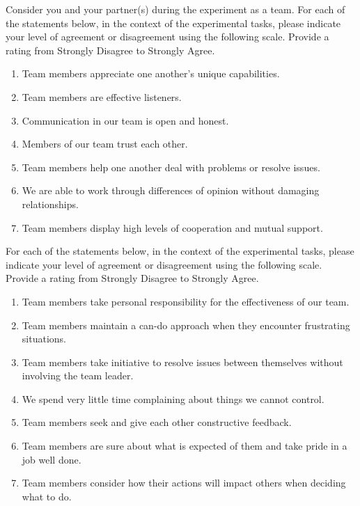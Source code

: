 \documentclass[msom,nonblindrev]{01 latex/class/informs3}
\begin{document}
\begin{APPENDICES}
Consider you and your partner(s) during the experiment as a team.
For each of the statements below, in the context of the experimental tasks, please indicate your level of agreement or disagreement using the following scale. Provide a rating from Strongly Disagree to Strongly Agree.

\begin{enumerate}
    \item Team members appreciate one another's unique capabilities.
    \item Team members are effective listeners.
    \item Communication in our team is open and honest.
    \item Members of our team trust each other.
    \item Team members help one another deal with problems or resolve issues.
    \item We are able to work through differences of opinion without damaging relationships.
    \item Team members display high levels of cooperation and mutual support.
\end{enumerate}

\vspace{5mm}
For each of the statements below, in the context of the experimental tasks, please indicate your level of agreement or disagreement using the following scale. Provide a rating from Strongly Disagree to Strongly Agree.

\begin{enumerate}
    \item Team members take personal responsibility for the effectiveness of our team.
    \item Team members maintain a can-do approach when they encounter frustrating situations.
    \item Team members take initiative to resolve issues between themselves without involving the team leader.
    \item We spend very little time complaining about things we cannot control.
    \item Team members seek and give each other constructive feedback.
    \item Team members are sure about what is expected of them and take pride in a job well done.
    \item Team members consider how their actions will impact others when deciding what to do.
\end{enumerate}


\end{APPENDICES}
\end{document}
